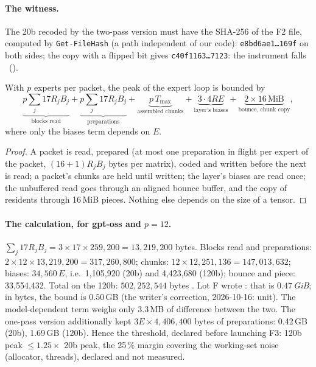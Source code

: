 \paragraph{The witness.} The 20b recoded by the two-pass version must have the SHA-256 of the F2 file, computed by \texttt{Get-FileHash} (a path independent of our code): \texttt{e8bd6ae1…169f} on both sides; the copy with a flipped bit gives \texttt{c40f1163…7123}: the instrument falls \mes~().

\begin{proposition}\label{t2fmt:prop:memoire}
With $p$ experts per packet, the peak of the expert loop is bounded by
\[
\underbrace{p \sum_j 17 R_j B_j}_{\text{blocks read}} + \underbrace{p \sum_j 17 R_j B_j}_{\text{preparations}} + \underbrace{p\, T_{\max}}_{\text{assembled chunks}} + \underbrace{3 \cdot 4 R E}_{\text{layer's biases}} + \underbrace{2 \times 16\,\mathrm{MiB}}_{\text{bounce, chunk copy}},
\]
where only the biases term depends on $E$.
\end{proposition}
\begin{proof}
A packet is read, prepared (at most one preparation in flight per expert of the packet, $(16 + 1) R_j B_j$ bytes per matrix), coded and written before the next is read; a packet's chunks are held until written; the layer's biases are read once; the unbuffered read goes through an aligned bounce buffer, and the copy of residents through 16\,MiB pieces. Nothing else depends on the size of a tensor.
\end{proof}

\paragraph{The calculation, for gpt-oss and $p = 12$.} $\sum_j 17 R_j B_j = 3 \times 17 \times 259{,}200 = 13{,}219{,}200$ bytes. Blocks read and preparations: $2 \times 12 \times 13{,}219{,}200 = 317{,}260{,}800$; chunks: $12 \times 12{,}251{,}136 = 147{,}013{,}632$; biases: $34{,}560\,E$, i.e.\ 1{,}105{,}920 (20b) and 4{,}423{,}680 (120b); bounce and piece: 33{,}554{,}432. Total on the 120b: $502{,}252{,}544$ bytes \calc. Lot F wrote : that is $0.47$\,\emph{GiB}; in bytes, the bound is $0.50$\,GB (the writer's correction, 2026-10-16: unit). The model-dependent term weighs only 3.3\,MB of difference between the two. The one-pass version additionally kept $3 E \times 4{,}406{,}400$ bytes of preparations: 0.42\,GB (20b), 1.69\,GB (120b). Hence the threshold, declared before launching F3: 120b peak $\le 1.25 \times$ 20b peak, the 25\,\% margin covering the working-set noise (allocator, threads), declared and not measured.


